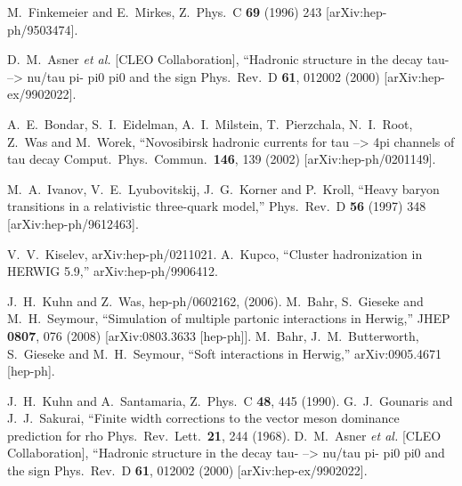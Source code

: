 \documentclass{article}
\begin{document}
\begin{thebibliography}{99}
M.~Finkemeier and E.~Mirkes,
Z.\ Phys.\  C {\bf 69} (1996) 243 [arXiv:hep-ph/9503474].

  D.~M.~Asner {\it et al.}  [CLEO Collaboration],
   ``Hadronic structure in the decay tau- --> nu/tau pi- pi0 pi0 and the  sign
  Phys.\ Rev.\  D {\bf 61}, 012002 (2000)
  [arXiv:hep-ex/9902022].

  A.~E.~Bondar, S.~I.~Eidelman, A.~I.~Milstein, T.~Pierzchala, N.~I.~Root, Z.~Was and M.~Worek,
   ``Novosibirsk hadronic currents for tau --> 4pi channels of tau decay
  Comput.\ Phys.\ Commun.\  {\bf 146}, 139 (2002)
  [arXiv:hep-ph/0201149].

  M.~A.~Ivanov, V.~E.~Lyubovitskij, J.~G.~Korner and P.~Kroll,
  ``Heavy baryon transitions in a relativistic three-quark model,''
  Phys.\ Rev.\  D {\bf 56} (1997) 348
  [arXiv:hep-ph/9612463].

 V.~V.~Kiselev, arXiv:hep-ph/0211021.
  A.~Kupco,
  ``Cluster hadronization in HERWIG 5.9,''
  arXiv:hep-ph/9906412.

 J.~H.~Kuhn and Z.~Was, hep-ph/0602162, (2006).
  M.~Bahr, S.~Gieseke and M.~H.~Seymour,
  ``Simulation of multiple partonic interactions in Herwig,''
  JHEP {\bf 0807}, 076 (2008)
  [arXiv:0803.3633 [hep-ph]].
  M.~Bahr, J.~M.~Butterworth, S.~Gieseke and M.~H.~Seymour,
  ``Soft interactions in Herwig,''
  arXiv:0905.4671 [hep-ph].

  J.~H.~Kuhn and A.~Santamaria,
  Z.\ Phys.\  C {\bf 48}, 445 (1990).
  G.~J.~Gounaris and J.~J.~Sakurai,
   ``Finite width corrections to the vector meson dominance prediction for rho
  Phys.\ Rev.\ Lett.\  {\bf 21}, 244 (1968).
  D.~M.~Asner {\it et al.}  [CLEO Collaboration],
   ``Hadronic structure in the decay tau- --> nu/tau pi- pi0 pi0 and the  sign
  Phys.\ Rev.\  D {\bf 61}, 012002 (2000)
  [arXiv:hep-ex/9902022].


\end{thebibliography}
\end{document}
